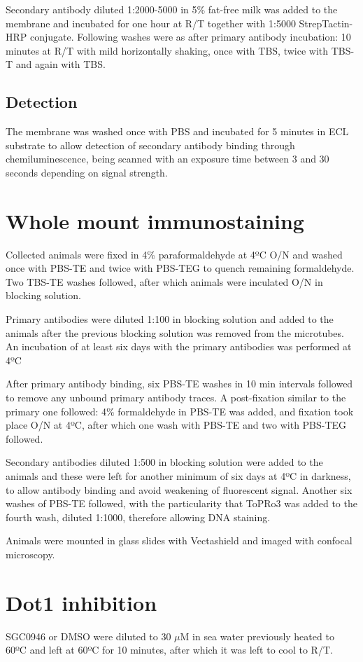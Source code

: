 \documentclass[11pt,twoside,a4paper]{report}
\begin{document}
			Secondary antibody diluted 1:2000-5000 in 5\% fat-free milk was added to the membrane and incubated for one hour at R/T together with 1:5000 StrepTactin-HRP conjugate. Following washes were as after primary antibody incubation: 10 minutes at R/T with mild horizontally shaking, once with TBS, twice with TBS-T and again with TBS.
			\subsection{Detection}
			The membrane was washed once with PBS and incubated for 5 minutes in ECL substrate to allow detection of secondary antibody binding through chemiluminescence, being scanned with an exposure time between 3 and 30 seconds depending on signal strength.
		
	\section{Whole mount immunostaining}
		Collected animals were fixed in 4\% paraformaldehyde at 4ºC O/N and washed once with PBS-TE and twice with PBS-TEG to quench remaining formaldehyde. Two TBS-TE washes followed, after which animals were inculated O/N in blocking solution.
		
		Primary antibodies were diluted 1:100 in blocking solution and added to the animals after the previous blocking solution was removed from the microtubes. An incubation of at least six days with the primary antibodies was performed at 4ºC
		
		After primary antibody binding, six PBS-TE washes in 10 min intervals followed to remove any unbound primary antibody traces. A post-fixation similar to the primary one followed: 4\% formaldehyde in PBS-TE was added, and fixation took place O/N at 4ºC, after which one wash with PBS-TE and two with PBS-TEG followed. 
		
		Secondary antibodies diluted 1:500 in blocking solution were added to the animals  and these were left for another minimum of six days at 4ºC in darkness, to allow antibody binding and avoid weakening of fluorescent signal. Another six washes of PBS-TE followed, with the particularity that ToPRo3 was added to the fourth wash, diluted 1:1000, therefore allowing DNA staining.
		
		Animals were mounted in glass slides with Vectashield and imaged with confocal microscopy.
	
	\section{Dot1 inhibition}
		SGC0946 or DMSO were diluted to 30 $\mu$M in sea water previously heated to 60ºC and left at 60ºC for 10 minutes, after which it was left to cool to R/T.
		
\end{document}
